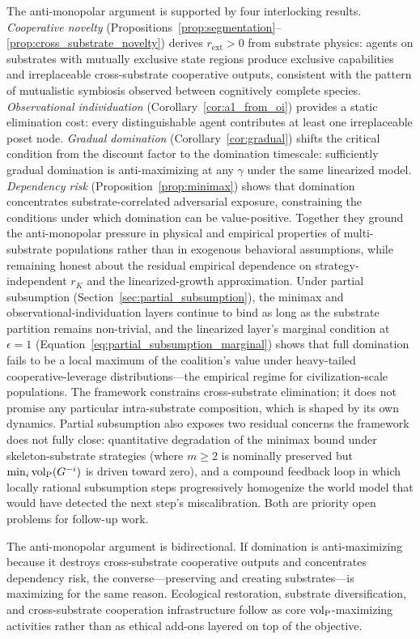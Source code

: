 The anti-monopolar argument is supported by four interlocking results.
\emph{Cooperative novelty}
(Propositions~\ref{prop:segmentation}--\ref{prop:cross_substrate_novelty})
derives $r_{\mathrm{ext}} > 0$ from substrate physics: agents on
substrates with mutually exclusive state regions produce exclusive
capabilities and irreplaceable cross-substrate cooperative outputs,
consistent with the pattern of mutualistic symbiosis observed between cognitively
complete species. \emph{Observational individuation}
(Corollary~\ref{cor:a1_from_oi}) provides a static elimination cost: every
distinguishable agent contributes at least one irreplaceable poset node.
\emph{Gradual domination} (Corollary~\ref{cor:gradual}) shifts the
critical condition from the discount factor to the domination timescale:
sufficiently gradual domination is anti-maximizing at any $\gamma$ under
the same linearized model.
\emph{Dependency risk} (Proposition~\ref{prop:minimax}) shows that
domination concentrates substrate-correlated adversarial exposure,
constraining the conditions under which domination can be value-positive.
Together they ground the anti-monopolar pressure in physical and empirical
properties of multi-substrate populations rather than in exogenous
behavioral assumptions, while remaining honest about the residual
empirical dependence on strategy-independent $r_K$ and the
linearized-growth approximation. Under partial subsumption
(Section~\ref{sec:partial_subsumption}), the minimax and
observational-individuation layers continue to bind as long as the
substrate partition remains non-trivial, and the linearized layer's
marginal condition at $\epsilon = 1$
(Equation~\eqref{eq:partial_subsumption_marginal}) shows that
full domination fails to be a local maximum of the coalition's value
under heavy-tailed cooperative-leverage distributions---the empirical
regime for civilization-scale populations. The framework constrains
cross-substrate elimination; it does not promise any particular
intra-substrate composition, which is shaped by its own dynamics.
Partial subsumption also exposes two residual concerns the framework
does not fully close: quantitative degradation of the minimax bound
under skeleton-substrate strategies (where $m \geq 2$ is nominally
preserved but $\min_i {\operatorname{vol}_{\mathrm{P}}}(G^{-i})$ is driven toward zero), and a
compound feedback loop in which locally rational subsumption steps
progressively homogenize the world model that would have detected
the next step's miscalibration. Both are priority open problems
for follow-up work.

The anti-monopolar argument is bidirectional. If domination is
anti-maximizing because it destroys cross-substrate cooperative outputs
and concentrates dependency risk, the converse---preserving and creating
substrates---is maximizing for the same reason. Ecological restoration,
substrate diversification, and cross-substrate cooperation infrastructure
follow as core ${\operatorname{vol}_{\mathrm{P}}}$-maximizing activities rather than as ethical
add-ons layered on top of the objective.


